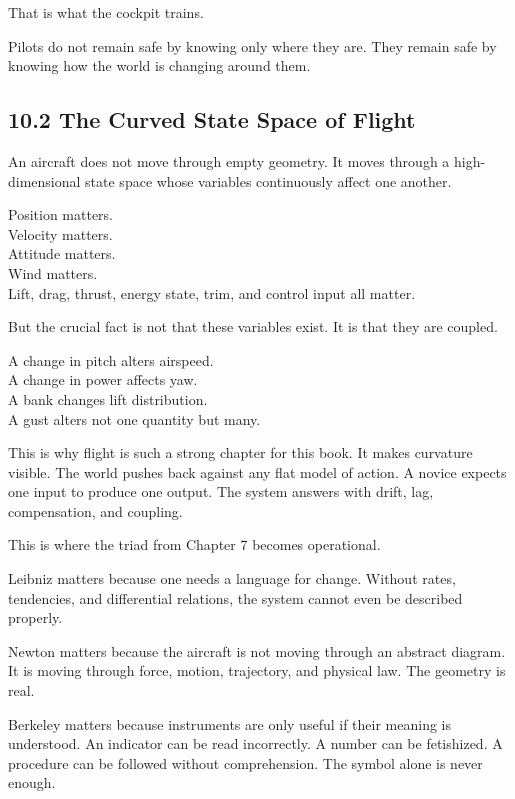 That is what the cockpit trains.

Pilots do not remain safe by knowing only where they are. They remain
safe by knowing how the world is changing around them.

\hypertarget{the-curved-state-space-of-flight}{%
\subsection{10.2 The Curved State Space of
Flight}\label{the-curved-state-space-of-flight}}

An aircraft does not move through empty geometry. It moves through a
high-dimensional state space whose variables continuously affect one
another.

Position matters.\\
Velocity matters.\\
Attitude matters.\\
Wind matters.\\
Lift, drag, thrust, energy state, trim, and control input all matter.

But the crucial fact is not that these variables exist. It is that they
are coupled.

A change in pitch alters airspeed.\\
A change in power affects yaw.\\
A bank changes lift distribution.\\
A gust alters not one quantity but many.

This is why flight is such a strong chapter for this book. It makes
curvature visible. The world pushes back against any flat model of
action. A novice expects one input to produce one output. The system
answers with drift, lag, compensation, and coupling.

This is where the triad from Chapter 7 becomes operational.

Leibniz matters because one needs a language for change. Without rates,
tendencies, and differential relations, the system cannot even be
described properly.

Newton matters because the aircraft is not moving through an abstract
diagram. It is moving through force, motion, trajectory, and physical
law. The geometry is real.

Berkeley matters because instruments are only useful if their meaning is
understood. An indicator can be read incorrectly. A number can be
fetishized. A procedure can be followed without comprehension. The
symbol alone is never enough.

